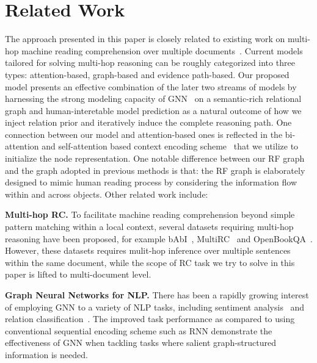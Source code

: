 \section{Related Work}
The approach presented in this paper is closely related to existing work on multi-hop machine reading comprehension over multiple documents~\cite{Zhong2019, Cao2019,BAG,Chen2019}. Current models tailored for solving multi-hop reasoning can be roughly categorized into three types: attention-based, graph-based and evidence path-based. Our proposed
model presents an effective combination of the later two streams of models by harnessing the strong modeling capacity of GNN~\cite{DBLP:journals/corr/KipfW16} on a semantic-rich relational graph and human-interetable model prediction as a natural outcome of how we inject relation prior and iteratively induce the complete reasoning path. One connection between our model and attention-based ones is reflected in the bi-attention and self-attention based context encoding scheme~\cite{Zhong2019} that we utilize to initialize the node representation.
One notable difference between our RF graph and the graph adopted in previous methods is that: the RF graph is elaborately designed to mimic human reading process by considering the information flow within and across objects. 
Other related work include:

\textbf{Multi-hop RC.} To facilitate machine reading comprehension beyond simple pattern matching within a local context, several datasets requiring multi-hop reasoning have been proposed, for example bAbI~\cite{weston2015towards}, MultiRC~\cite{khashabi-etal-2018-looking} and OpenBookQA~\cite{DBLP:journals/corr/abs-1809-02789}. However, these datasets requires mulit-hop inference over multiple sentences within the same document, while the scope of RC task we try to solve in this paper is lifted to multi-document level.

\textbf{Graph Neural Networks for NLP.} There has been a rapidly growing interest of employing GNN to a variety of NLP tasks, including sentiment analysis~\cite{Huang2019, Zhang2019} and relation classification~\cite{Guo2019, Zhu2019}. The improved task performance as compared to using conventional sequential encoding scheme such as RNN demonstrate the effectiveness of GNN when tackling tasks where salient graph-structured information is needed.